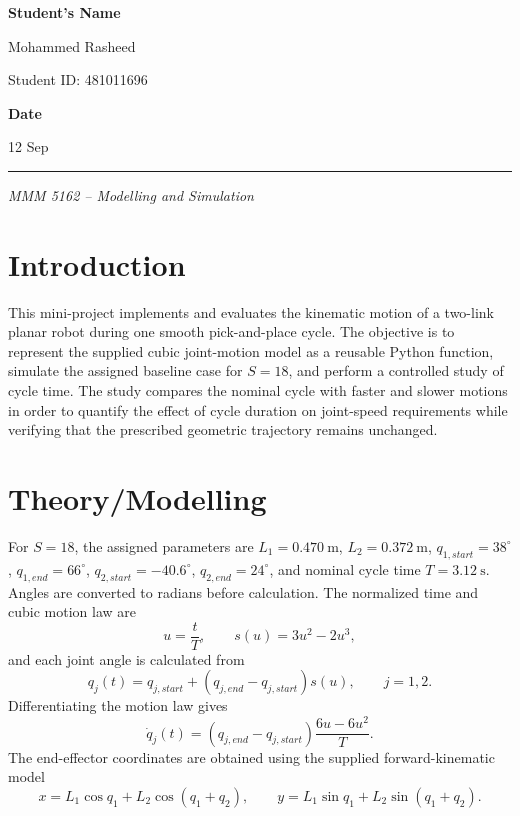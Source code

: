 \documentclass[12pt,a4paper]{article}
\newcommand{\studentname}{Mohammed Rasheed}
\newcommand{\studentid}{481011696}
\newcommand{\submissiondate}{12 Sep}
\begin{document}
\begin{titlepage}
{\bfseries\large Student's Name\par}
\vspace{0.1cm}
{\large \studentname\par}
{\large Student ID: \studentid\par}

\vfill

{\bfseries\large Date\par}
\vspace{0.1cm}
{\large \submissiondate\par}

\vspace{0.6cm}
\hrule
\vspace{0.15cm}
{\small\itshape MMM 5162 -- Modelling and Simulation}

\end{titlepage}

\setcounter{page}{1}

\section{Introduction}

This mini-project implements and evaluates the kinematic motion of a two-link planar robot during one smooth pick-and-place cycle. The objective is to represent the supplied cubic joint-motion model as a reusable Python function, simulate the assigned baseline case for \(S=18\), and perform a controlled study of cycle time. The study compares the nominal cycle with faster and slower motions in order to quantify the effect of cycle duration on joint-speed requirements while verifying that the prescribed geometric trajectory remains unchanged.

\section{Theory/Modelling}

For \(S=18\), the assigned parameters are \(L_1=0.470~\mathrm{m}\), \(L_2=0.372~\mathrm{m}\), \(q_{1,start}=38^\circ\), \(q_{1,end}=66^\circ\), \(q_{2,start}=-40.6^\circ\), \(q_{2,end}=24^\circ\), and nominal cycle time \(T=3.12~\mathrm{s}\). Angles are converted to radians before calculation. The normalized time and cubic motion law are
\[
u=\frac{t}{T}, \qquad s(u)=3u^2-2u^3,
\]
and each joint angle is calculated from
\[
q_j(t)=q_{j,start}+\left(q_{j,end}-q_{j,start}\right)s(u), \qquad j=1,2.
\]
Differentiating the motion law gives
\[
\dot q_j(t)=\left(q_{j,end}-q_{j,start}\right)
\frac{6u-6u^2}{T}.
\]
The end-effector coordinates are obtained using the supplied forward-kinematic model
\[
x=L_1\cos q_1+L_2\cos(q_1+q_2), \qquad
y=L_1\sin q_1+L_2\sin(q_1+q_2).
\]
\end{document}
